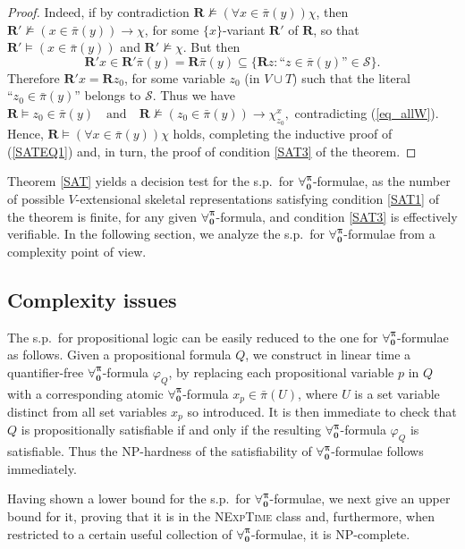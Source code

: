 \documentclass[a4paper,UKenglish]{lipics}
\newcommand{\Lang}{\ensuremath{\mathbf{\forall_{0}^{\pi}}}\xspace}
\newcommand{\nonpairs}[1]{\bar{\pi}(#1)}
\newcommand{\atset}{\mathcal{S}}
\newcommand{\aslit}[1]{\mbox{``}#1\mbox{''}}
\newcommand{\real}{\mathbf{R}}
\begin{document}
\begin{proof}
Indeed, if by contradiction $\real \not\models (\forall x \in
\nonpairs{y})\chi$, then $\real' \not\models (x \in \nonpairs{y})
\rightarrow \chi$, for some $\{x\}$-variant $\real'$ of $\real$, so
that $\real' \models (x \in \nonpairs{y})$ and $\real' \not\models
\chi$. But then
\[
\real' x \in \real' \nonpairs{y} = \real \nonpairs{y} \subseteq
\{\real z : \aslit{z \in \nonpairs{y}} \in \atset\}.
\]
Therefore $\real' x = \real z_{0}$, for some variable $z_{0}$ (in $V
\cup T$) such that the literal $\aslit{z_{0} \in \nonpairs{y}}$
belongs to $\atset$. Thus we have
$
\real \models z_{0} \in \nonpairs{y} \quad \text{and} \quad
\real \not\models (z_{0} \in \nonpairs{y}) \rightarrow
\chi^{x}_{z_{0}},
$
contradicting (\ref{eq_allW}).
%
Hence, $\real \models (\forall x \in \nonpairs{y})\chi$ holds,
completing the inductive proof of (\ref{SATEQ1}) and, in turn, the
proof of condition \ref{SAT3} of the theorem.
%
\end{proof}

Theorem \ref{SAT} yields a decision test for the s.p.\ for \Lang-formulae, as the number of possible $V$-extensional
skeletal representations satisfying condition \ref{SAT1} of the
theorem is finite, for any given \Lang-formula, and condition
\ref{SAT3} is effectively verifiable.  In the following section, we
analyze the s.p.\ for \Lang-formulae from a
complexity point of view.

\subsection{Complexity issues}

The s.p.\ for propositional logic can be easily
reduced to the one for \Lang-formulae as follows.  Given a
propositional formula $Q$, we construct in linear time a
quantifier-free \Lang-formula $\varphi_{Q}$, by replacing each
propositional variable $p$ in $Q$ with a corresponding atomic
\Lang-formula $x_{p} \in \nonpairs{U}$, where $U$ is a set variable
distinct from all set variables $x_{p}$ so introduced.  It is then
immediate to check that $Q$ is propositionally satisfiable if and only
if the resulting \Lang-formula $\varphi_{Q}$ is satisfiable.  Thus the
\textsc{NP}-hardness of the satisfiability of \Lang-formulae follows
immediately.

Having shown a lower bound for the s.p.\ for \Lang-formulae, we next
give an upper bound for it, proving that it is in the
\textsc{NExpTime} class and, furthermore, when restricted to a certain
useful collection of \Lang-formulae, it is \textsc{NP}-complete.
\end{document}
